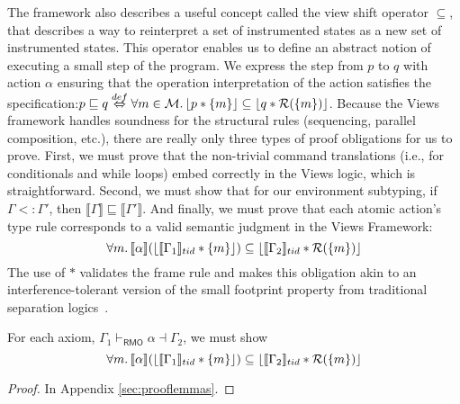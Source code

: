 The framework also describes a useful concept called the view shift operator $\subseteq$, that describes a way to reinterpret a set of instrumented states as a new set of instrumented states. This operator enables us to define an abstract notion of executing a small step of the program. We express the step from $p$ to $q$ with action $\alpha$ ensuring that the operation interpretation of the action satisfies the specification:$ p \sqsubseteq q \stackrel{def}{\Leftrightarrow} \forall m\in\mathcal{M} \ldotp \lfloor p * \{ m \} \rfloor \subseteq \lfloor q* \mathcal{R}(\{m\})\rfloor$. Because the Views framework handles soundness for the structural rules (sequencing, parallel composition, etc.), there are really only three types of proof obligations for us to prove.  First, we must prove that the non-trivial command translations (i.e., for conditionals and while loops) embed correctly in the Views logic, which is straightforward.  Second, we must show that for our environment subtyping, if $\Gamma<:\Gamma'$, then $\llbracket{\Gamma}\rrbracket\sqsubseteq\llbracket\Gamma'\rrbracket$.  And finally, we must prove that each atomic action's type rule corresponds to a valid semantic judgment in the Views Framework:
\[
\forall m\ldotp   \llbracket \alpha \rrbracket ( \lfloor \llbracket \Gamma_{1} \rrbracket_{tid}  * \{m\} \rfloor) \subseteq
  \lfloor \llbracket \Gamma_{2} \rrbracket_{tid} * \mathcal{R}(\{m\}) \rfloor
  \]
The use of $*$ validates the frame rule and makes this obligation akin to an interference-tolerant version of the small footprint property from traditional separation logics~\cite{Reynolds:2002:SLL:645683.664578,Calcagno:2007:LAA:1270399.1271718}.
\begin{theorem}
For each axiom, $\Gamma_{1} \vdash_{\textsf{RMO}} \alpha \dashv \Gamma_{2}$, we must show
\[
\forall m\ldotp   \llbracket \alpha \rrbracket  (\lfloor \llbracket \Gamma_{1} \rrbracket_{tid}  * \{m\} \rfloor )\subseteq  \lfloor \llbracket \Gamma_{2} \rrbracket_{tid} * \mathcal{R}(\{m\}) \rfloor
\]
\end{theorem}
\begin{proof}
In Appendix \ref{sec:prooflemmas}.
\end{proof}

